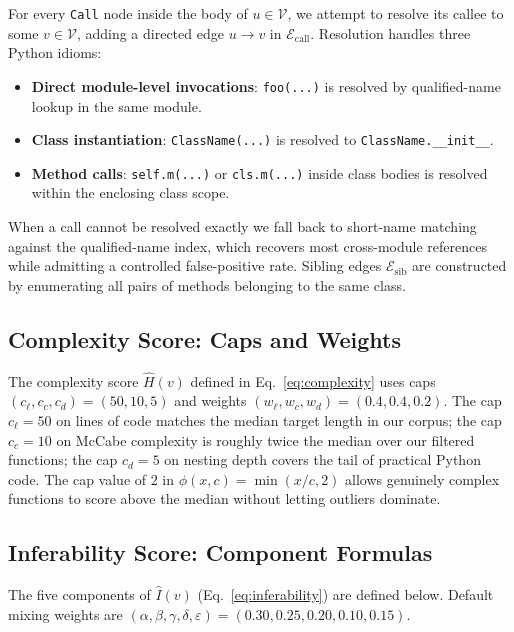 For every \texttt{Call} node inside the body of $u \in \mathcal{V}$, we
attempt to resolve its callee to some $v \in \mathcal{V}$, adding a
directed edge $u \to v$ in $\mathcal{E}_{\mathrm{call}}$. Resolution
handles three Python idioms:
\begin{itemize}\setlength\itemsep{0.1em}
  \item \textbf{Direct module-level invocations}: \texttt{foo(...)} is
        resolved by qualified-name lookup in the same module.
  \item \textbf{Class instantiation}: \texttt{ClassName(...)} is
        resolved to \texttt{ClassName.\_\_init\_\_}.
  \item \textbf{Method calls}: \texttt{self.m(...)} or \texttt{cls.m(...)}
        inside class bodies is resolved within the enclosing class scope.
\end{itemize}
When a call cannot be resolved exactly we fall back to short-name
matching against the qualified-name index, which recovers most
cross-module references while admitting a controlled false-positive rate.
Sibling edges $\mathcal{E}_{\mathrm{sib}}$ are constructed by
enumerating all pairs of methods belonging to the same class.

\subsection{Complexity Score: Caps and Weights}
\label{app:algo:hyperparams}

The complexity score $\hat{H}(v)$ defined in Eq.~\eqref{eq:complexity}
uses caps $(c_{\ell}, c_{c}, c_{d}) = (50, 10, 5)$ and weights
$(w_{\ell}, w_{c}, w_{d}) = (0.4, 0.4, 0.2)$. The cap $c_{\ell}=50$
on lines of code matches the median target length in our corpus; the
cap $c_c=10$ on McCabe complexity is roughly twice the median over our
filtered functions; the cap $c_d=5$ on nesting depth covers the tail of
practical Python code. The cap value of $2$ in $\phi(x,c)=\min(x/c,2)$
allows genuinely complex functions to score above the median without
letting outliers dominate.

\subsection{Inferability Score: Component Formulas}
\label{app:algo:inferability}

The five components of $\hat{I}(v)$ (Eq.~\ref{eq:inferability}) are
defined below. Default mixing weights are
$(\alpha,\beta,\gamma,\delta,\varepsilon) = (0.30, 0.25, 0.20, 0.10, 0.15)$.

